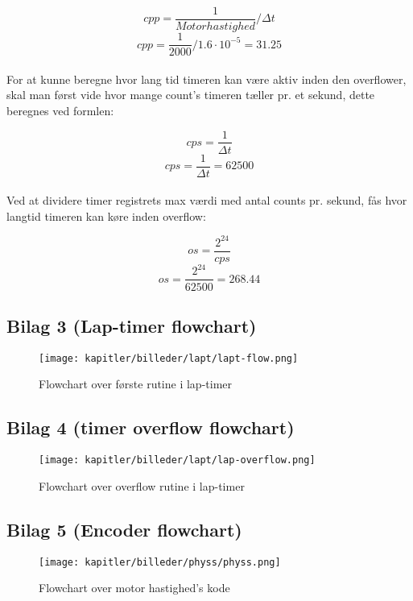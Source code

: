 \documentclass[11pt]{article}
\begin{document}
$$cpp = \frac{1}{Motor hastighed} / \Delta t$$
$$cpp = \frac{1}{2000} / 1.6 \cdot 10^{-5} = 31.25$$\\

For at kunne beregne hvor lang tid timeren kan være aktiv inden den overflower, skal man først vide hvor mange count's timeren tæller pr. et sekund, dette  beregnes ved formlen:

$$cps = \frac{1}{\Delta t}$$
$$cps = \frac{1}{\Delta t} = 62500$$\\

Ved at dividere timer registrets max værdi med antal counts pr. sekund, fås hvor langtid timeren kan køre inden overflow:

$$os = \frac{2^{24}}{cps}$$
$$os = \frac{2^{24}}{62500} = 268.44$$


\newpage
\subsection{Bilag 3 (Lap-timer flowchart)}

\begin{figure}[h]
\centering
\texttt{[image: kapitler/billeder/lapt/lapt-flow.png]}
\caption{Flowchart over første rutine i lap-timer}
\label{fig:lapt-flow}
\end{figure}


\newpage
\subsection{Bilag 4 (timer overflow flowchart)}
\begin{figure}[h]
\centering
\texttt{[image: kapitler/billeder/lapt/lap-overflow.png]}
\caption{Flowchart over overflow rutine i lap-timer}
\label{fig:lap-overflow}
\end{figure}

\newpage
\subsection{Bilag 5 (Encoder flowchart)}
\begin{figure}[h]
\centering
\texttt{[image: kapitler/billeder/physs/physs.png]}
\caption{Flowchart over motor hastighed's kode}
\label{fig:physs}
\end{figure}
\end{document}
